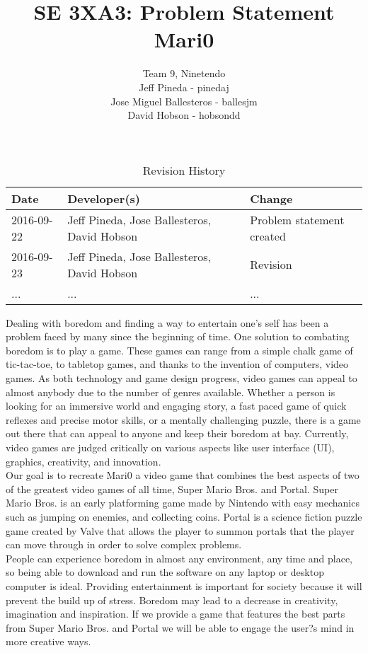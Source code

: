 \documentclass{article}
\title{SE 3XA3: Problem Statement\\Mari0}
\author{Team 9, Ninetendo
		\\ Jeff Pineda - pinedaj
		\\ Jose Miguel Ballesteros - ballesjm
		\\ David Hobson - hobsondd
}
\date{}
\begin{document}
\begin{table}[hp]
\caption{Revision History} \label{TblRevisionHistory}
\begin{tabularx}{\textwidth}{llX}
\toprule
\textbf{Date} & \textbf{Developer(s)} & \textbf{Change}\\
\midrule
2016-09-22 & Jeff Pineda, Jose Ballesteros, David Hobson & Problem statement created\\
2016-09-23 & Jeff Pineda, Jose Ballesteros, David Hobson & Revision\\
... & ... & ...\\
\bottomrule
\end{tabularx}
\end{table}

\newpage

\maketitle

Dealing with boredom and finding a way to entertain one's self has been a problem faced by many since the beginning of time. One solution to combating boredom is to play a game. These games can range from a simple chalk game of tic-tac-toe, to tabletop games, and thanks to the invention of computers, video games. As both technology and game design progress, video games can appeal to almost anybody due to the number of genres available. Whether a person is looking for an immersive world and engaging story, a fast paced game of quick reflexes and precise motor skills, or a mentally challenging puzzle, there is a game out there that can appeal to anyone and keep their boredom at bay. Currently, video games are judged critically on various aspects like user interface (UI), graphics, creativity, and innovation.\\
 
Our goal is to recreate Mari0 a video game that combines the best aspects of two of the greatest video games of all time, Super Mario Bros. and Portal. Super Mario Bros. is an early platforming game made by Nintendo with easy mechanics such as jumping on enemies, and collecting coins. Portal is a science fiction puzzle game created by Valve that allows the player to summon portals that the player can move through in order to solve complex problems.\\
 
People can experience boredom in almost any environment, any time and place, so being able to download and run the software on any laptop or desktop computer is ideal. Providing entertainment is important for society because it will prevent the build up of stress. Boredom may lead to a decrease in creativity, imagination and inspiration. If we provide a game that features the best parts from Super Mario Bros. and Portal we will be able to engage the user?s mind in more creative ways.\\
 
\end{document}
